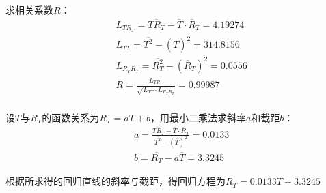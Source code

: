\documentclass[UTF-8, a4paper, 12pt]{ctexart}
\begin{document}
  求相关系数$R$：$$\begin{array}{ll}
    &L_{TR_T} = \overline{TR_T} - \overline T \cdot \overline R_T = 4.19274 \\
    &L_{TT} = \overline{T^2} - (\overline T)^2 = 314.8156 \\
    &L_{R_TR_T} = \overline{R_T^2} - (\overline R_T)^2 = 0.0556 \\ 
    &R = \frac{L_{TR_T}}{\sqrt{L_{TT}\cdot L_{R_TR_T}}} = 0.99987 \\
  \end{array}$$

  设$T$与$R_T$的函数关系为$R_T = aT + b$，用最小二乘法求斜率$a$和截距$b$：
  $$\begin{aligned}
    &a = \frac{\overline{TR_T} - \overline T \cdot \overline R_T}{\overline{T^2} - (\overline T)^2} = 0.0133\\
    &b = \overline{R_T} - a \overline T = 3.3245
  \end{aligned}$$

  根据所求得的回归直线的斜率与截距，得回归方程为$R_T = 0.0133 T + 3.3245$


\end{document}
